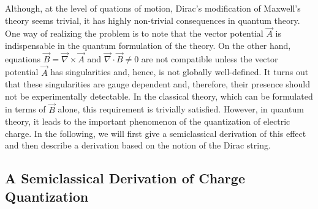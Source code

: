 Although, at the level of quations of motion, Dirac's modification of
Maxwell's theory seems trivial, it has highly non-trivial consequences
in quantum theory. One way of realizing the problem is to note that
the vector potential $\vec{A}$ is indispensable in the quantum
formulation of the theory. On the other hand, equations
$\vec{B}=\vec{\nabla}\times \vec{A}$ and $\vec{\nabla}\cdot\vec{B}\ne
0$ are not compatible unless the vector potential $\vec{A}$ has
singularities and, hence, is not globally well-defined. It turns out
that these singularities are gauge dependent and, therefore, their
presence should not be experimentally  detectable. In the classical
theory, which can be formulated in terms of $\vec B$ alone, this
requirement is trivially satisfied. However, in quantum theory, it
leads to the important phenomenon of the quantization of electric
charge. In the following, we will first give a semiclassical
derivation of this effect and then describe a derivation based on the
notion of the Dirac string. 
 
\subsection{A Semiclassical Derivation of Charge Quantization}

